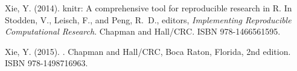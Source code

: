 \documentclass{article}\usepackage[table]{xcolor}
\renewcommand{\$}{$} %
\begin{document}
\begin{thebibliography}{}
Xie, Y. (2014).
\newblock knitr: A comprehensive tool for reproducible research in {R}.
\newblock In Stodden, V., Leisch, F., and Peng, R.~D., editors, {\em
  Implementing Reproducible Computational Research}. Chapman and Hall/CRC.
\newblock ISBN 978-1466561595.

Xie, Y. (2015).
.
\newblock Chapman and Hall/CRC, Boca Raton, Florida, 2nd edition.
\newblock ISBN 978-1498716963.

\end{thebibliography}
\end{document}
